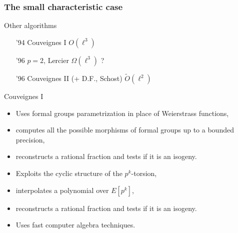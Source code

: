 \documentclass[10pt]{beamer}
\newcommand{\0}{\mathcal{O}}  %
\newcommand{\tildO}{\tilde{O}}  %
\begin{document}
\begin{frame}
  \frametitle{The small characteristic case}

  \begin{block}{Other algorithms}
    \begin{itemize}
    \item['94] Couveignes I \hfill $O(\ell^3)$
    \item['96] $p=2$, Lercier \hfill $\Omega(\ell^3)$ ?
    \item['96] Couveignes II (+ D.F., Schost) \hfill $\tildO(\ell^2)$
    \end{itemize}
  \end{block}
  
  \begin{block}{Couveignes I}
    \begin{overprint}
      \begin{itemize}
      \item Uses formal groups parametrization in place of Weierstrass functions,
      \item computes all the possible morphisms of formal groups up to a bounded precision,
      \item reconstructs a rational fraction and tests if it is an isogeny.
      \end{itemize}
 
      \begin{itemize}
      \item Exploits the cyclic structure of the $p^k$-torsion,
      \item interpolates a polynomial over $E[p^k]$,
      \item reconstructs a rational fraction and tests if it is an isogeny.
      \item Uses fast computer algebra techniques.
      \end{itemize}
    \end{overprint}
  \end{block}
\end{frame}

\end{document}
